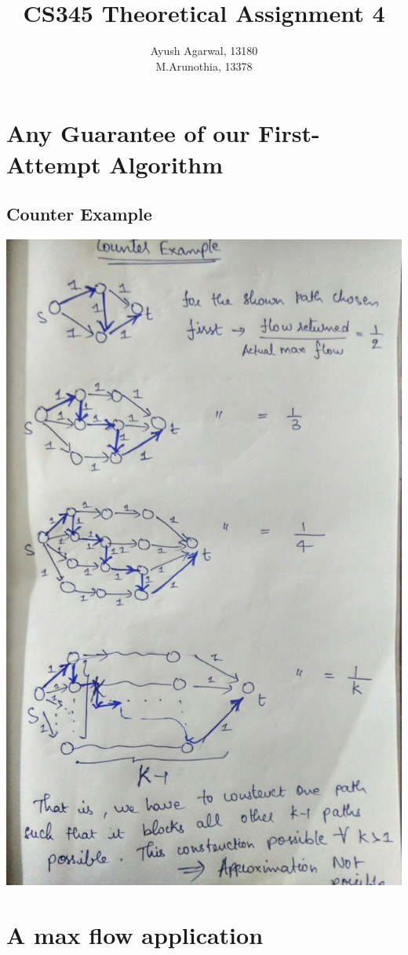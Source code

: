 \documentclass{article}
\title{CS345 Theoretical Assignment 4 \\ }
\author{\vspace{2mm} \large Ayush Agarwal, 13180 \\ M.Arunothia, 13378}
\date{}
\begin{document}
\maketitle
\tableofcontents
\newpage
\section{Any Guarantee of our First-Attempt Algorithm}
\subsection{Counter Example}
\includegraphics[scale=0.5]{1.jpg}
\newpage
\section{A max flow application}
\end{document}
